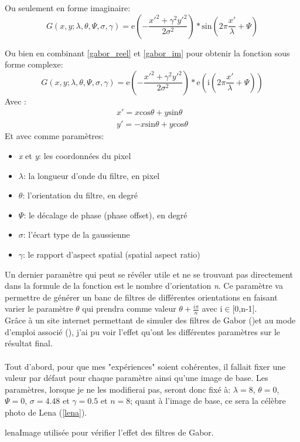 \documentclass[poster]{polytech/polytech}
\begin{document}
Ou seulement en forme imaginaire:
\begin{equation}
G(x,y;\lambda ,\theta ,\Psi ,\sigma ,\gamma )=\mathrm{e}(- \frac{x'^2+\gamma ^2 y'^2}{2\sigma ^2})*\mathrm{sin}(2\pi \frac{x'}{\lambda}+\Psi)
\label{gabor_im}
\end{equation}

Ou bien en combinant \eqref{gabor_reel} et \eqref{gabor_im} pour obtenir la fonction sous forme complexe:
\begin{equation}
G(x,y;\lambda ,\theta ,\Psi ,\sigma ,\gamma )=\mathrm{e}(- \frac{x'^2+\gamma ^2 y'^2}{2\sigma ^2})*\mathrm{e}(\mathrm{i}(2\pi \frac{x'}{\lambda}+\Psi))
\label{gabor_complexe}
\end{equation}
Avec :
\begin{align*}
x'=x\mathrm{cos}\theta + y\mathrm{sin}\theta \\
y'= -x\mathrm{sin}\theta + y\mathrm{cos}\theta
\end{align*}
Et avec comme paramètres:
\begin{itemize}
\item \textit{x} et \textit{y}: les coordonnées du pixel
\item $\lambda $: la longueur d'onde du filtre, en pixel
\item $\theta $: l'orientation du filtre, en degré
\item $\Psi $: le décalage de phase (phase offset), en degré
\item $\sigma $: l'écart type de la gaussienne
\item $\gamma $: le rapport d'aspect spatial (spatial aspect ratio)\\
\end{itemize}

Un dernier paramètre qui peut se révéler utile et ne se trouvant pas directement dans la formule de la fonction est le nombre d'orientation \textit{n}. Ce paramètre va permettre de générer un banc de filtres de différentes orientations en faisant varier le paramètre $\theta $ qui prendra comme valeur $\theta + \frac{i\pi}{n}$ avec i$\in $[0,n-1].\\
Grâce à un site internet permettant de simuler des filtres de Gabor (\cite{simu_gabor})et au mode d'emploi associé (\cite{instr_simu_gabor}), j'ai pu voir l'effet qu'ont les différentes paramètres sur le résultat final.\\
\\
Tout d'abord, pour que mes "expériences" soient cohérentes, il fallait fixer une valeur par défaut pour chaque paramètre ainsi qu'une image de base. Les paramètres, lorsque je ne les modifierai pas, seront donc fixé à: $\lambda = 8 $, $\theta = 0 $, $\Psi = 0 $, $\sigma = 4.48 $ et $\gamma = 0.5 $ et $n = 8 $; quant à l'image de base, ce sera la célèbre photo de Lena (\autoref{lena}).
\begin{Figure}{lena}{Image utilisée pour vérifier l'effet des filtres de Gabor}.
\end{Figure}
\end{document}
